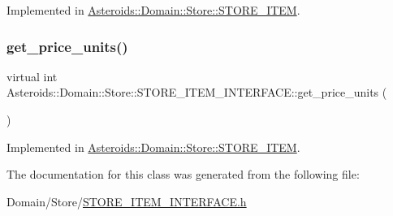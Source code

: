 Implemented in \hyperlink{classAsteroids_1_1Domain_1_1Store_1_1STORE__ITEM_a55c625077b78bf51b53880a2a77a8ece}{Asteroids\+::\+Domain\+::\+Store\+::\+S\+T\+O\+R\+E\+\_\+\+I\+T\+EM}.

\mbox{\label{classAsteroids_1_1Domain_1_1Store_1_1STORE__ITEM__INTERFACE_ae9fbf8488c53bbf068980d97866ec269}} 
\subsubsection{\texorpdfstring{get\+\_\+price\+\_\+units()}{get\_price\_units()}}
{\footnotesize\ttfamily virtual int Asteroids\+::\+Domain\+::\+Store\+::\+S\+T\+O\+R\+E\+\_\+\+I\+T\+E\+M\+\_\+\+I\+N\+T\+E\+R\+F\+A\+C\+E\+::get\+\_\+price\+\_\+units (\begin{DoxyParamCaption}{ }\end{DoxyParamCaption})\hspace{0.3cm}{\ttfamily [pure virtual]}}



Implemented in \hyperlink{classAsteroids_1_1Domain_1_1Store_1_1STORE__ITEM_ad79bef2044b0f10c7e2a08bc84a9d9f2}{Asteroids\+::\+Domain\+::\+Store\+::\+S\+T\+O\+R\+E\+\_\+\+I\+T\+EM}.



The documentation for this class was generated from the following file\+:\begin{DoxyCompactItemize}
\item 
Domain/\+Store/\hyperlink{STORE__ITEM__INTERFACE_8h}{S\+T\+O\+R\+E\+\_\+\+I\+T\+E\+M\+\_\+\+I\+N\+T\+E\+R\+F\+A\+C\+E.\+h}\end{DoxyCompactItemize}
